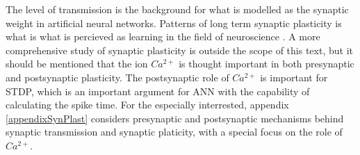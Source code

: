 The level of transmission is the background for what is modelled as the synaptic weight in artificial neural networks.
Patterns of long term synaptic plasticity is what is what is percieved as learning in the field of neuroscience \cite{NeuroscienceExploringTheBrain3edKAP25}.
A more comprehensive study of synaptic plasticity is outside the scope of this text, but it should be mentioned that the ion $Ca^{2+}$ is thought important in both presynaptic and postsynaptic plasticity.
The postsynaptic role of $Ca^{2+}$ is important for STDP, which is an important argument for ANN with the capability of calculating the spike time.
For the especially interrested, appendix \ref{appendixSynPlast} considers presynaptic and postsynaptic mechanisms behind synaptic transmission and synaptic platicity, with a special focus on the role of $Ca^{2+}$.























